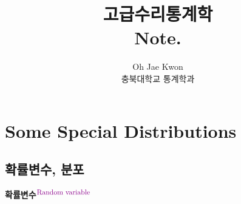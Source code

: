 \documentclass{oblivoir}
\newcommand{\DC}[1]{\textcolor{DarkMagenta}{#1}}%
\newcommand{\UP}[1]{$^{\mbox{\DC{\footnotesize #1}}}$}
\begin{document}
\title{\LARGE\bfseries 고급수리통계학 \\  \large Note. }
\author{\large Oh Jae Kwon \medskip \\{\normalsize 충북대학교 통계학과}}
\maketitle

\tableofcontents
\newpage

\chapter{\LARGE Some Special Distributions}

\section{확률변수, 분포}
\textbf{확률변수}\UP{Random variable}
\end{document}
